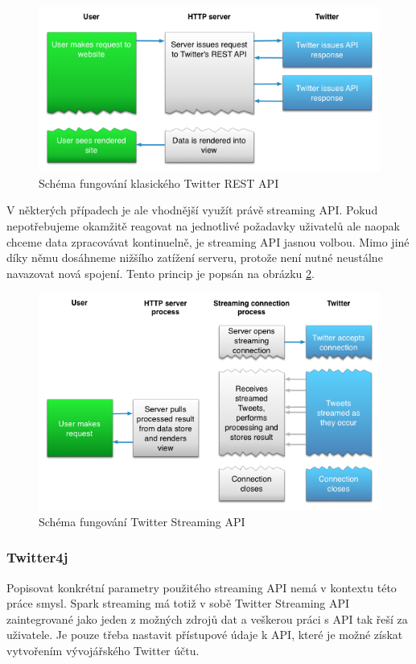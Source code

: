 \documentclass[thesis=B,czech]{FITthesis}[2012/06/26]
\begin{document}
\begin{figure}[ht]
   	\centering
   	\includegraphics[width=1\textwidth]{images/twitter-rest.png}
   	\caption{Schéma fungování klasického Twitter REST API\cite{twitter-rest-stream}}
   	\label{fig:twitter_rest}
\end{figure}

	V některých případech je ale vhodnější využít právě streaming API. Pokud nepotřebujeme okamžitě reagovat na jednotlivé požadavky uživatelů ale naopak chceme data zpracovávat kontinuelně, je streaming API jasnou volbou. Mimo jiné díky němu dosáhneme nižšího zatížení serveru, protože není nutné neustálne navazovat nová spojení. Tento princip je popsán na obrázku \ref{fig:twitter_streaming}. 

\begin{figure}[ht]
   	\centering
   	\includegraphics[width=1\textwidth]{images/twitter-streaming.png}
   	\caption{Schéma fungování Twitter Streaming API\cite{twitter-rest-stream}}
   	\label{fig:twitter_streaming}
\end{figure}


\subsubsection{Twitter4j}
	Popisovat konkrétní parametry použitého streaming API nemá v kontextu této práce smysl. Spark streaming má totiž v sobě Twitter Streaming API zaintegrované jako jeden z možných zdrojů dat a veškerou práci s API tak řeší za uživatele. Je pouze třeba nastavit přístupové údaje k API, které je možné získat vytvořením vývojářského Twitter účtu. 
	
\end{document}
